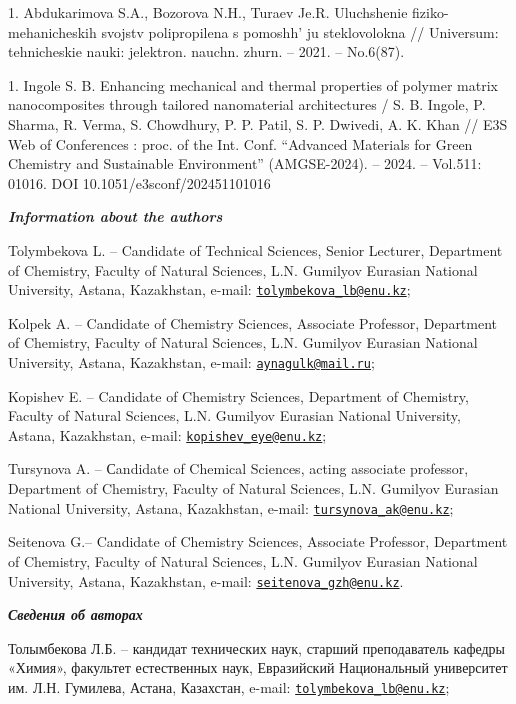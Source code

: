 1. Abdukarimova S.A., Bozorova N.H., Turaev Je.R. Uluchshenie
fiziko-mehanicheskih svojstv polipropilena s
pomoshh' ju steklovolokna // Universum: tehnicheskie
nauki: jelektron. nauchn. zhurn. -- 2021. -- No.6(87).

1. Ingole S. B. Enhancing mechanical and thermal properties of polymer
matrix nanocomposites through tailored nanomaterial architectures / S.
B. Ingole, P. Sharma, R. Verma, S. Chowdhury, P. P. Patil, S. P.
Dwivedi, A. K. Khan // E3S Web of Conferences : proc. of the Int.
Conf. ``Advanced Materials for Green Chemistry and Sustainable
Environment'' (AMGSE-2024). -- 2024. -- Vol.511: 01016. DOI
10.1051/e3sconf/202451101016

\begin{authorinfo}
\emph{{\bfseries Information about the authors}}

Tolymbekova L. -- Candidate of Technical Sciences, Senior Lecturer,
Department of Chemistry, Faculty of Natural Sciences, L.N. Gumilyov
Eurasian National University, Astana, Kazakhstan, e-mail:
\href{mailto:tolymbekova\_lb@enu.kz}{\nolinkurl{tolymbekova\_lb@enu.kz}};

Kolpek A. -- Candidate of Chemistry Sciences, Associate Professor,
Department of Chemistry, Faculty of Natural Sciences, L.N. Gumilyov
Eurasian National University, Astana, Kazakhstan, e-mail:
\href{mailto:aynagulk@mail.ru}{\nolinkurl{aynagulk@mail.ru}};

Kopishev E. -- Candidate of Chemistry Sciences, Department of Chemistry,
Faculty of Natural Sciences, L.N. Gumilyov Eurasian National University,
Astana, Kazakhstan, e-mail:
\href{mailto:kopishev\_eye@enu.kz}{\nolinkurl{kopishev\_eye@enu.kz}};

Tursynova A. -- Сandidate of Chemical Sciences, acting associate
professor, Department of Chemistry, Faculty of Natural Sciences, L.N.
Gumilyov Eurasian National University, Astana, Kazakhstan, e-mail:
\href{mailto:tursynova\_ak@enu.kz}{\nolinkurl{tursynova\_ak@enu.kz}};

Seitenova G.-- Candidate of Chemistry Sciences, Associate Professor,
Department of Chemistry, Faculty of Natural Sciences, L.N. Gumilyov
Eurasian National University, Astana, Kazakhstan, e-mail:
\href{mailto:seitenova\_gzh@enu.kz}{\nolinkurl{seitenova\_gzh@enu.kz}}.

\emph{{\bfseries Сведения об авторах}}

Толымбекова Л.Б. -- кандидат технических наук, старший преподаватель
кафедры «Химия», факультет естественных наук, Евразийский Национальный
университет им. Л.Н. Гумилева, Астана, Казахстан, e-mail:
\href{mailto:tolymbekova\_lb@enu.kz}{\nolinkurl{tolymbekova\_lb@enu.kz}};


\end{authorinfo}
